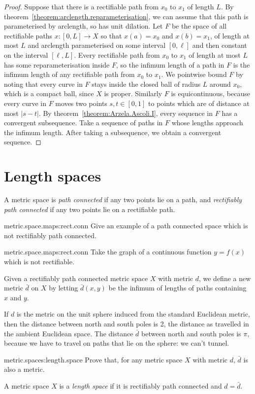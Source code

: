 \begin{proof}
Suppose that there is a rectifiable path from \(x_0\) to \(x_1\) of length \(L\).
By theorem~\vref{theorem:arclength.reparameterisation}, we can assume that this path is parameterised by arclength, so has unit dilation.
Let \(F\) be the space of all rectifiable paths \(x \colon [0,L] \to X\) so that \(x(a)=x_0\) and \(x(b)=x_1\), of length at most \(L\) and arclength parameterised on some interval \([0,\ell]\) and then constant on the interval \([\ell,L]\).
Every rectifiable path from \(x_0\) to \(x_1\) of length at most \(L\) has some reparameterisation inside \(F\), so the infimum length of a path in \(F\) is the infimum length of any rectifiable path from \(x_0\) to \(x_1\).
We pointwise bound \(F\) by noting that every curve in \(F\) stays inside the closed ball of radius \(L\) around \(x_0\), which is a compact ball, since \(X\) is proper.
Similarly \(F\) is equicontinuous, because every curve in \(F\) moves two points \(s,t \in [0,1]\) to points which are of distance at most \(|s-t|\).
By theorem~\vref{theorem:Arzela.Ascoli.I}, every sequence in \(F\) has a convergent subsequence.
Take a sequence of paths in \(F\) whose lengths approach the infimum length.
After taking a subsequence, we obtain a convergent sequence.
\end{proof}

\section{Length spaces}
A metric space is \emph{path connected} if any two points lie on a path, and \emph{rectifiably path connected} if any two points lie on a rectifiable path.
\begin{problem}{metric.space.maps:rect.conn}
Give an example of a path connected space which is not rectifiably path connected.
\end{problem}
\begin{answer}{metric.space.maps:rect.conn}
Take the graph of a continuous function \(y=f(x)\) which is not rectifiable.
\end{answer}
Given a rectifiably path connected metric space \(X\) with metric \(d\), we define a new metric \(\bar{d}\) on \(X\) by letting \(\bar{d}(x,y)\) be the infimum of lengths of paths containing \(x\) and \(y\).
\begin{example}
If \(d\) is the metric on the unit sphere induced from the standard Euclidean metric, then the distance between north and south poles is 2, the distance as travelled in the ambient Euclidean space.
The distance \(\bar{d}\) between north and south poles is \(\pi\), because we have to travel on paths that lie on the sphere: we can't tunnel.
\end{example}
\begin{problem}{metric.spaces:length.space}
Prove that, for any metric space \(X\) with metric \(d\), \(\bar{d}\) is also a metric.
\end{problem}
A metric space \(X\) is a \emph{length space} if it is rectifiably path connected and \(d=\bar{d}\).

